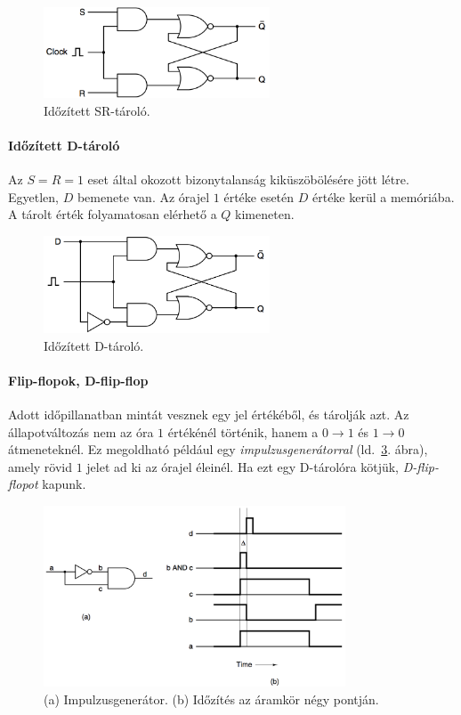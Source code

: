 \documentclass[10pt]{article}
\begin{document}
\begin{figure}[htbp]
	\centering
		\includegraphics[width=0.6\textwidth]{img/idozitettsrtarolo}
	\caption{Időzített SR-tároló.\label{fig:idozitettsrtarolo}}
\end{figure}

\paragraph{Időzített D-tároló}

Az $S=R=1$ eset által okozott bizonytalanság kiküszöbölésére jött létre. Egyetlen, $D$ bemenete van. Az órajel $1$ értéke esetén $D$ értéke kerül a memóriába. A tárolt érték folyamatosan elérhető a $Q$ kimeneten.

\begin{figure}[htbp]
	\centering
		\includegraphics[width=0.6\textwidth]{img/dtarolo}
	\caption{Időzített D-tároló.\label{fig:dtarolo}}
\end{figure}

\paragraph{Flip-flopok, D-flip-flop}

Adott időpillanatban mintát vesznek egy jel értékéből, és tárolják azt. Az állapotváltozás nem az óra $1$ értékénél történik, hanem a $0 \rightarrow 1$ és $1 \rightarrow 0$ átmeneteknél. Ez megoldható például egy \emph{impulzusgenerátorral} (ld.~\ref{fig:impulzusgenerator}. ábra), amely rövid $1$ jelet ad ki az órajel éleinél. Ha ezt egy D-tárolóra kötjük, \emph{D-flip-flopot} kapunk.

\begin{figure}[htbp]
	\centering
		\includegraphics[width=0.8\textwidth]{img/impulzusgenerator}
	\caption{(a) Impulzusgenerátor. (b) Időzítés az áramkör négy pontján.\label{fig:impulzusgenerator}}
\end{figure}
\end{document}

